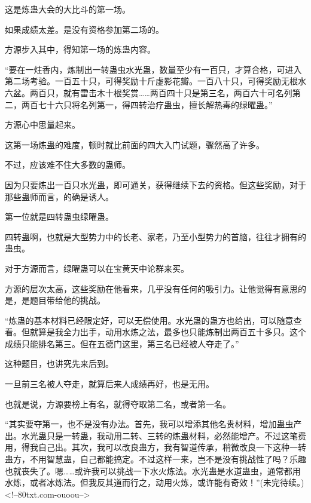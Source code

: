 \begin{this_body}
这是炼蛊大会的大比斗的第一场。

如果成绩太差。是没有资格参加第二场的。

方源步入其中，得知第一场的炼蛊内容。

“要在一炷香内，炼制出一转蛊虫水光蛊，数量至少有一百只，才算合格，可进入第二场考验。一百五十只，可得奖励十斤虚影花瓣。一百八十只，可得奖励无根水六盆。两百只，就有雷击木十根奖赏……两百四十只是第三名，两百六十可名列第二，两百七十六只将名列第一，得四转治疗蛊虫，擅长解热毒的绿曜蛊。”

方源心中思量起来。

这第一场炼蛊的难度，顿时就比前面的四大入门试题，骤然高了许多。

不过，应该难不住大多数的蛊师。

因为只要炼出一百只水光蛊，即可通关，获得继续下去的资格。但这些奖励，对于那些蛊师而言，的确是诱人。

第一位就是四转蛊虫绿曜蛊。

四转蛊啊，也就是大型势力中的长老、家老，乃至小型势力的首脑，往往才拥有的蛊虫。

对于方源而言，绿曜蛊可以在宝黄天中论群来买。

方源的层次太高，这些奖励在他看来，几乎没有任何的吸引力。让他觉得有意思的是，是题目带给他的挑战。

“炼蛊的基本材料已经限定好，可以无偿使用。水光蛊的蛊方也给出，可以随意查看。但就算是我全力出手，动用水炼之法，最多也只能炼制出两百五十多只。这个成绩只能排名第三。但在五德门这里，第三名已经被人夺走了。”

这种题目，也讲究先来后到。

一旦前三名被人夺走，就算后来人成绩再好，也是无用。

也就是说，方源要榜上有名，就得夺取第二名，或者第一名。

“其实要夺第一，也不是没有办法。首先，我可以增添其他名贵材料，增加蛊虫产出。水光蛊只是一转蛊，我动用二转、三转的炼蛊材料，必然能增产。不过这笔费用，得我自己出。其次，我可以改良蛊方，我有智道传承，稍微改良一下这种一转蛊方，不用智慧蛊，自己都能搞定。不过这样一来，岂不是没有挑战性了吗？乐趣也就丧失了。嗯……或许我可以挑战一下水火炼法。水光蛊是水道蛊虫，通常都用水炼，或者冰炼法。但我反其道而行之，动用火炼，或许能有奇效！”(未完待续。)<!--80txt.com-ouoou-->

\end{this_body}

